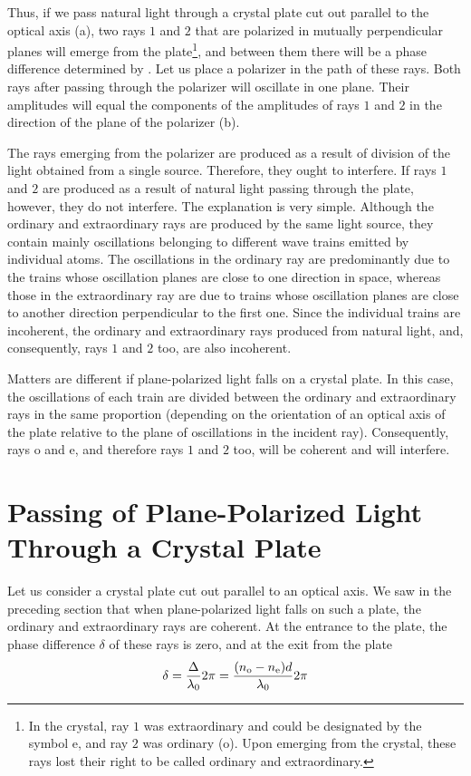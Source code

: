 Thus, if we pass natural light through a crystal plate cut out parallel to the optical axis (a), two rays $1$ and $2$ that are
polarized in mutually perpendicular planes will emerge from the plate\footnote{In the crystal, ray $1$ was extraordinary and could be designated by the symbol e, and ray $2$ was ordinary (o). Upon emerging from the crystal, these rays lost their right to be called ordinary and extraordinary.}, and between them there will be a phase difference determined by .
Let us place a polarizer in the path of these rays.
Both rays after passing through the polarizer will oscillate in one plane.
Their amplitudes will equal the components of the amplitudes of rays $1$ and $2$ in the direction of the plane of the polarizer (b).

The rays emerging from the polarizer are produced as a result of division of the light obtained from a single source.
Therefore, they ought to interfere.
If rays $1$ and $2$ are produced as a result of natural light passing through the plate, however, they do not interfere.
The explanation is very simple.
Although the ordinary and extraordinary rays are produced by the same light source, they contain mainly oscillations belonging to different wave trains emitted by individual atoms.
The oscillations in the ordinary ray are predominantly due to the trains whose oscillation planes are close to one direction in space, whereas those in the extraordinary ray are due to trains whose oscillation planes are close to another direction perpendicular to the first one.
Since the individual trains are incoherent, the ordinary and extraordinary rays produced from natural light, and, consequently, rays $1$ and $2$ too, are also incoherent.

Matters are different if plane-polarized light falls on a crystal plate.
In this case, the oscillations of each train are divided between the ordinary and extraordinary rays in the same proportion (depending on the orientation of an optical axis of the plate relative to the plane of oscillations in the incident ray).
Consequently, rays o and e, and therefore rays $1$ and $2$ too, will be coherent and will interfere.

\section{Passing of Plane-Polarized Light Through a Crystal Plate}\label{sec:19_5}

Let us consider a crystal plate cut out parallel to an optical axis.
We saw in the preceding section that when plane-polarized light falls on such a plate, the ordinary and extraordinary rays are coherent.
At the entrance to the plate, the phase difference $\delta$ of these rays is zero, and at the exit from the plate
\begin{equation}\label{eq:19_13}
	\delta = \frac{\Delta}{\lambda_0} 2\pi = \frac{(n_{\text{o}} - n_{\text{e}}) d}{\lambda_0} 2\pi
\end{equation}

